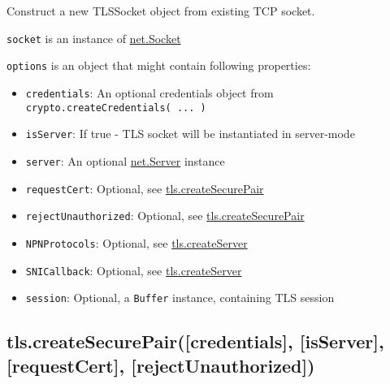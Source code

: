 Construct a new TLSSocket object from existing TCP socket.

\texttt{socket} is an instance of
\href{net.html\#net_class_net_socket}{net.Socket}

\texttt{options} is an object that might contain following properties:

\begin{itemize}
\item
  \texttt{credentials}: An optional credentials object from
  \texttt{crypto.createCredentials( ... )}
\item
  \texttt{isServer}: If true - TLS socket will be instantiated in
  server-mode
\item
  \texttt{server}: An optional
  \href{net.html\#net_class_net_server}{net.Server} instance
\item
  \texttt{requestCert}: Optional, see
  \hyperref[tlsux5ftlsux5fcreatesecurepairux5fcredentialsux5fisserverux5frequestcertux5frejectunauthorized]{tls.createSecurePair}
\item
  \texttt{rejectUnauthorized}: Optional, see
  \hyperref[tlsux5ftlsux5fcreatesecurepairux5fcredentialsux5fisserverux5frequestcertux5frejectunauthorized]{tls.createSecurePair}
\item
  \texttt{NPNProtocols}: Optional, see
  \hyperref[tlsux5ftlsux5fcreateserverux5foptionsux5fsecureconnectionlistener]{tls.createServer}
\item
  \texttt{SNICallback}: Optional, see
  \hyperref[tlsux5ftlsux5fcreateserverux5foptionsux5fsecureconnectionlistener]{tls.createServer}
\item
  \texttt{session}: Optional, a \texttt{Buffer} instance, containing TLS
  session
\end{itemize}

\subsection{tls.createSecurePair({[}credentials{]}, {[}isServer{]},
{[}requestCert{]},
{[}rejectUnauthorized{]})}\label{tls.createsecurepaircredentials-isserver-requestcert-rejectunauthorized}

\begin{Shaded}
\begin{Highlighting}[]
 \NormalTok{- }  
\end{Highlighting}
\end{Shaded}

